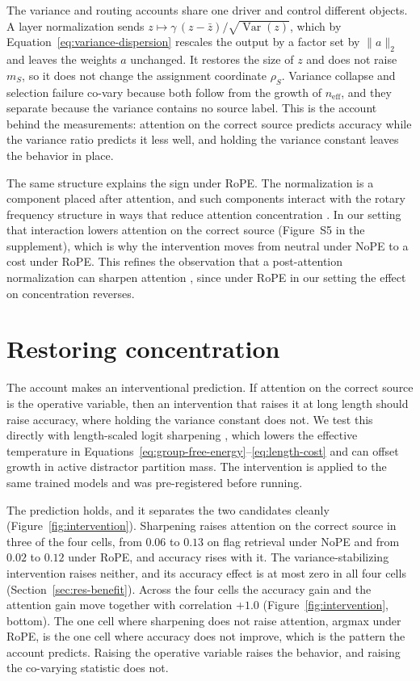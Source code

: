 \documentclass[letterpaper]{article} %
\begin{document}
The variance and routing accounts share one driver and control different objects.
A layer normalization sends $z\mapsto \gamma\,(z-\bar z)/\sqrt{\operatorname{Var}(z)}$, which by
Equation~\ref{eq:variance-dispersion} rescales the output by a factor set by $\lVert a\rVert_2$ and leaves the weights
$a$ unchanged.
It restores the size of $z$ and does not raise $m_S$, so it does not change the assignment coordinate
$\rho_S$.
Variance collapse and selection failure co-vary because both follow from the growth of $n_{\mathrm{eff}}$,
and they separate because the variance contains no source label.
This is the account behind the measurements: attention on the correct source predicts accuracy while the
variance ratio predicts it less well, and holding the variance constant leaves the behavior in place.

The same structure explains the sign under RoPE.
The normalization is a component placed after attention, and such components interact with the rotary
frequency structure in ways that reduce attention concentration \citep{fope}.
In our setting that interaction lowers attention on the correct source (Figure~S5 in the supplement), which is
why the intervention moves from neutral under NoPE to a cost under RoPE.
This refines the observation that a post-attention normalization can sharpen attention \citep{postnorm},
since under RoPE in our setting the effect on concentration reverses.

\section{Restoring concentration}
\label{sec:sharpening}

The account makes an interventional prediction.
If attention on the correct source is the operative variable, then an intervention that raises it at long
length should raise accuracy, where holding the variance constant does not.
We test this directly with length-scaled logit sharpening \citep{ssmax}, which lowers the effective
temperature in Equations~\ref{eq:group-free-energy}--\ref{eq:length-cost} and can offset growth in active
distractor partition mass.
The intervention is applied to the same trained models and was pre-registered before running.

The prediction holds, and it separates the two candidates cleanly (Figure~\ref{fig:intervention}).
Sharpening raises attention on the correct source in three of the four cells, from $0.06$ to $0.13$ on flag
retrieval under NoPE and from $0.02$ to $0.12$ under RoPE, and accuracy rises with it.
The variance-stabilizing intervention raises neither, and its accuracy effect is at most zero in all four
cells (Section~\ref{sec:res-benefit}).
Across the four cells the accuracy gain and the attention gain move together with correlation $+1.0$
(Figure~\ref{fig:intervention}, bottom).
The one cell where sharpening does not raise attention, argmax under RoPE, is the one cell where accuracy
does not improve, which is the pattern the account predicts.
Raising the operative variable raises the behavior, and raising the co-varying statistic does not.
\end{document}
